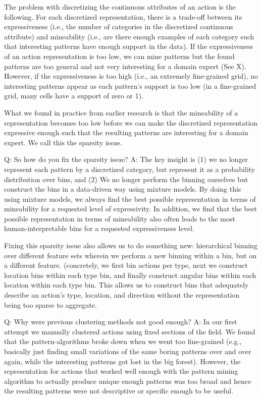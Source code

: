\documentclass[runningheads]{llncs}
\begin{document}
The problem with discretizing the continuous attributes of an action is the following. For each discretized representation, there is a trade-off between its expressiveness (i.e., the number of categories in the discretized continuous attribute) and mineability (i.e., are there enough examples of each category such that interesting patterns have enough support in the data). If the expressiveness of an action representation is too low, we can mine patterns but the found patterns are too general and not very interesting for a domain expert (See X). However, if the expressiveness is too high (i.e., an extremely fine-grained grid), no interesting patterns appear as each pattern's support is too low (in a fine-grained grid, many cells have a support of zero or 1).

What we found in practice from earlier research is that the mineability of a representation becomes too low before we can make the discretized representation expressive enough such that the resulting patterns are interesting for a domain expert. We call this the sparsity issue.

Q: So how do you fix the sparsity issue?
A: The key insight is (1) we no longer represent each pattern by a discretized category, but represent it as a probability distribution over bins, and (2) We no longer perform the binning ourselves but construct the bins in a data-driven way using mixture models. By doing this using mixture models, we always find the best possible representation in terms of mineability for a requested level of expressivity. In addition, we find that the best possible representation in terms of mineability also often leads to the most human-interpretable bins for a requested expressiveness level.

Fixing this sparsity issue also allows us to do something new: hierarchical binning over different feature sets wherein we perform a new binning within a bin, but on a different feature. (concretely, we first bin actions per type, next we construct location bins within each type bin, and finally construct angular bins within each location within each type bin. This allows us to construct bins that adequately describe an action's type, location, and direction without the representation being too sparse to aggregate.


Q: Why were previous clustering methods not good enough?
A: In our first attempt we manually clustered actions using fixed sections of the field. We found that the pattern-algorithms broke down when we went too fine-grained (e.g., basically just finding small variations of the same boring patterns over and over again, while the interesting patterns got lost in the big forest). However, the representation for actions that worked well enough with the pattern mining algorithm to actually produce unique enough patterns was too broad and hence the resulting patterns were not descriptive or specific enough to be useful.
\end{document}
